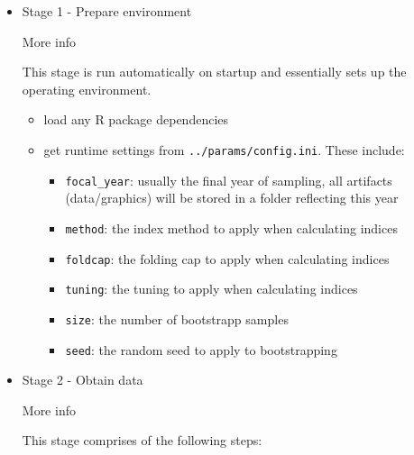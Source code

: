 \documentclass[
  8pt,
  a4paper]{article}
\providecommand{\tightlist}{%
  \setlength{\itemsep}{0pt}\setlength{\parskip}{0pt}}
\begin{document}
\begin{itemize}
\item
  Stage 1 - Prepare environment

  More info

  This stage is run automatically on startup and essentially sets up the
  operating environment.

  \begin{itemize}
  \tightlist
  \item
    load any R package dependencies
  \item
    get runtime settings from \texttt{../params/config.ini}. These
    include:

    \begin{itemize}
    \tightlist
    \item
      \texttt{focal\_year}: usually the final year of sampling, all
      artifacts (data/graphics) will be stored in a folder reflecting
      this year
    \item
      \texttt{method}: the index method to apply when calculating
      indices
    \item
      \texttt{foldcap}: the folding cap to apply when calculating
      indices
    \item
      \texttt{tuning}: the tuning to apply when calculating indices
    \item
      \texttt{size}: the number of bootstrapp samples
    \item
      \texttt{seed}: the random seed to apply to bootstrapping
    \end{itemize}
  \end{itemize}
\item
  Stage 2 - Obtain data

  More info

  This stage comprises of the following steps:


\end{itemize}
\end{document}
